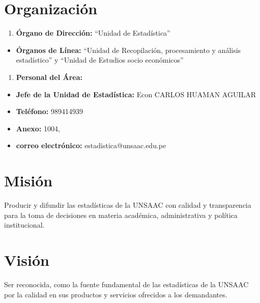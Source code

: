 \documentclass[
  12pt,
  letterpaper,
]{scrreprt}
\providecommand{\tightlist}{%
  \setlength{\itemsep}{0pt}\setlength{\parskip}{0pt}}\usepackage{longtable,booktabs,array}
\begin{document}
\section{Organización}\label{organizaciuxf3n}

\begin{enumerate}
\def\labelenumi{\arabic{enumi}.}
\tightlist
\item
  \textbf{Órgano de Dirección:} ``Unidad de Estadística''
\end{enumerate}

\begin{itemize}
\tightlist
\item
  \textbf{Órganos de Línea:} ``Unidad de Recopilación, procesamiento y
  análisis estadístico'' y ``Unidad de Estudios socio económicos''
\end{itemize}

\begin{enumerate}
\def\labelenumi{\arabic{enumi}.}
\setcounter{enumi}{1}
\tightlist
\item
  \textbf{Personal del Área:}
\end{enumerate}

\begin{itemize}
\tightlist
\item
  \textbf{Jefe de la Unidad de Estadística:} Econ CARLOS HUAMAN AGUILAR
\item
  \textbf{Teléfono:} 989414939
\item
  \textbf{Anexo:} 1004,
\item
  \textbf{correo electrónico:} estadistica@unsaac.edu.pe
\end{itemize}

\section{Misión}\label{misiuxf3n}

Producir y difundir las estadísticas de la UNSAAC con calidad y
transparencia para la toma de decisiones en materia académica,
administrativa y política institucional.

\section{Visión}\label{visiuxf3n}

Ser reconocida, como la fuente fundamental de las estadísticas de la
UNSAAC por la calidad en sus productos y servicios ofrecidos a los
demandantes.

\end{document}
